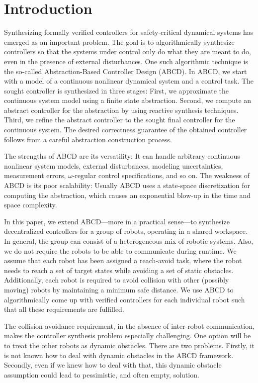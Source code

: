 
\section{Introduction}

Synthesizing formally verified controllers for safety-critical dynamical systems has emerged as an important problem.
The goal is to algorithmically synthesize controllers so that the systems under control only do what they are meant to do, even in the presence of external disturbances.
One such algorithmic technique is the so-called Abstraction-Based Controller Design (ABCD).
In ABCD, we start with a model of a continuous nonlinear dynamical system and a control task.
The sought controller is synthesized in three stages:
First, we approximate the continuous system model using a finite state abstraction.
Second, we compute an abstract controller for the abstraction by using reactive synthesis techniques.
Third, we refine the abstract controller to the sought final controller for the continuous system.
The desired correctness guarantee of the obtained controller follows from a careful abstraction construction process.

The strengths of ABCD are its versatility: 
It can handle arbitrary continuous nonlinear system models, external disturbances, modeling uncertainties, measurement errors, $\omega$-regular control specifications, and so on.
The weakness of ABCD is its poor scalability: 
Usually ABCD uses a state-space discretization for computing the abstraction, which causes an exponential blow-up in the time and space complexity.

In this paper, we extend ABCD---more in a practical sense---to synthesize decentralized controllers for a group of robots, operating in a shared workspace.
In general, the group can consist of a heterogeneous mix of robotic systems.
Also, we do not require the robots to be able to communicate during runtime.
We assume that each robot has been assigned a reach-avoid task, where the robot needs to reach a set of target states while avoiding a set of static obstacles.
Additionally, each robot is required to avoid collision with other (possibly moving) robots by maintaining a minimum safe distance.
We use ABCD to algorithmically come up with verified controllers for each individual robot such that all these requirements are fulfilled.

The collision avoidance requirement, in the absence of inter-robot communication, makes the controller synthesis problem especially challenging.
One option will be to treat the other robots as dynamic obstacles.
There are two problems.
Firstly, it is not known how to deal with dynamic obstacles in the ABCD framework.
Secondly, even if we knew how to deal with that, this dynamic obstacle assumption could lead to pessimistic, and often empty, solution.

